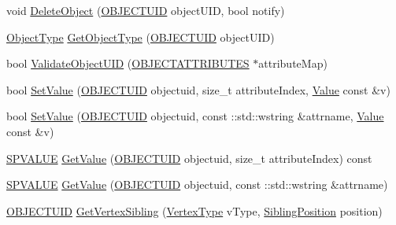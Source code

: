 \begin{DoxyCompactItemize}
\item 
void \hyperlink{class_c_object_database_add42984094166319b7c50df34827b9ce}{Delete\+Object} (\hyperlink{_object_database_defines_8h_a164ec120b01429b93c9cd0bef2a67e64}{O\+B\+J\+E\+C\+T\+U\+I\+D} object\+U\+I\+D, bool notify)
\item 
\hyperlink{_object_database_defines_8h_a842c5e2e69277690b064bf363c017980}{Object\+Type} \hyperlink{class_c_object_database_afee3ccff8a7bd6b185eec9bf96439f4a}{Get\+Object\+Type} (\hyperlink{_object_database_defines_8h_a164ec120b01429b93c9cd0bef2a67e64}{O\+B\+J\+E\+C\+T\+U\+I\+D} object\+U\+I\+D)
\item 
bool \hyperlink{class_c_object_database_a4609fe112c35837deafa53394bdbf5f2}{Validate\+Object\+U\+I\+D} (\hyperlink{_object_database_defines_8h_a52d1b76b66b20eeaf0c5dc8127da21d7}{O\+B\+J\+E\+C\+T\+A\+T\+T\+R\+I\+B\+U\+T\+E\+S} $\ast$attribute\+Map)
\item 
bool \hyperlink{class_c_object_database_a40c3ebf55f58e39a2dbc23f160041838}{Set\+Value} (\hyperlink{_object_database_defines_8h_a164ec120b01429b93c9cd0bef2a67e64}{O\+B\+J\+E\+C\+T\+U\+I\+D} objectuid, size\+\_\+t attribute\+Index, \hyperlink{class_value}{Value} const \&v)
\item 
bool \hyperlink{class_c_object_database_a085daae73e1da05e641289b2aebd952b}{Set\+Value} (\hyperlink{_object_database_defines_8h_a164ec120b01429b93c9cd0bef2a67e64}{O\+B\+J\+E\+C\+T\+U\+I\+D} objectuid, const \+::std\+::wstring \&attrname, \hyperlink{class_value}{Value} const \&v)
\item 
\hyperlink{_object_database_defines_8h_adb988003a1a002d7305cf476a0dbee1d}{S\+P\+V\+A\+L\+U\+E} \hyperlink{class_c_object_database_ae52aeb4df0246261114830aadbfdab40}{Get\+Value} (\hyperlink{_object_database_defines_8h_a164ec120b01429b93c9cd0bef2a67e64}{O\+B\+J\+E\+C\+T\+U\+I\+D} objectuid, size\+\_\+t attribute\+Index) const 
\item 
\hyperlink{_object_database_defines_8h_adb988003a1a002d7305cf476a0dbee1d}{S\+P\+V\+A\+L\+U\+E} \hyperlink{class_c_object_database_a07d2705ee35ba10d6051cd4eea220e1c}{Get\+Value} (\hyperlink{_object_database_defines_8h_a164ec120b01429b93c9cd0bef2a67e64}{O\+B\+J\+E\+C\+T\+U\+I\+D} objectuid, const \+::std\+::wstring \&attrname)
\item 
\hyperlink{_object_database_defines_8h_a164ec120b01429b93c9cd0bef2a67e64}{O\+B\+J\+E\+C\+T\+U\+I\+D} \hyperlink{class_c_object_database_af1fea10ecb69437f5a1c6d777d729eda}{Get\+Vertex\+Sibling} (\hyperlink{_object_database_defines_8h_afa099a55c5746eff5a0e1ffc04f53cc0}{Vertex\+Type} v\+Type, \hyperlink{_object_database_defines_8h_a9507b0b115184061c7002f25c82fc6d7}{Sibling\+Position} position)

\end{DoxyCompactItemize}
